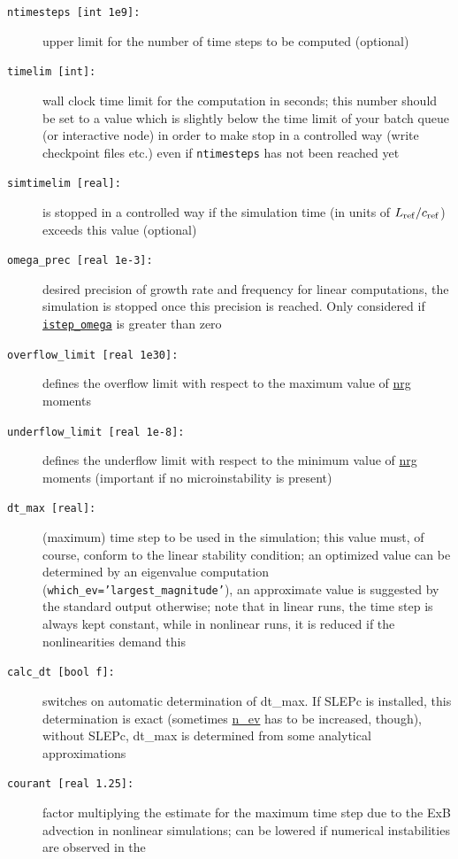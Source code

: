 \documentclass[12pt]{article}
\begin{document}
\begin{description}
\item[\texttt{ntimesteps [int 1e9]:}] upper limit for the number of time steps to be computed (optional)
\item[\texttt{timelim [int]:}] wall clock time limit for the \gene computation in seconds; this number
  should be set to a value which is slightly below the time limit of your batch queue (or interactive
  node) in order to make \gene stop in a  controlled way (write checkpoint files etc.) even if
  \texttt{ntimesteps} has not been reached yet
\item[\texttt{simtimelim [real]:}] \gene is stopped in a controlled way if the simulation time (in units of
 $L_{\rm ref}/c_{\rm ref}$) exceeds this value (optional)
\item[\hypertarget{omega_prec}{\tt omega\_prec [real 1e-3]:}] 
  desired precision of growth rate and frequency for linear computations, the simulation is stopped once
  this precision is reached. Only considered if \hyperlink{istep_omega}{\tt istep\_omega} is greater than zero
\item[{\tt overflow\_limit [real 1e30]:}] defines the overflow limit with respect to the maximum 
  value of \hyperref[subsec:nrg-file]{nrg} moments
\item[{\tt underflow\_limit [real 1e-8]:}] defines the underflow limit with respect to the minimum 
  value of \hyperref[subsec:nrg-file]{nrg} moments (important if no microinstability is present)
\item[\texttt{dt\_max [real]:}] (maximum) time step to be used in the simulation; this value must,
  of course, conform to the linear stability condition; an optimized value can be determined by an
  eigenvalue computation \\(\texttt{which\_ev='largest\_magnitude'}), an approximate value is suggested by the \gene
  standard output otherwise; note that in linear runs, the time step is always kept constant, 
  while in nonlinear runs, it is reduced if the nonlinearities demand this
\item[\texttt{calc\_dt [bool f]:}] switches on automatic determination of dt\_max. If SLEPc is installed, 
  this determination is exact (sometimes \hyperlink{n_ev}{n\_ev} has to be increased,
  though), without SLEPc, dt\_max is determined from some analytical approximations
\item[\texttt{courant [real 1.25]:}] factor multiplying the estimate for the maximum time step due to 
  the ExB advection in nonlinear simulations; can be lowered if numerical instabilities are observed in the

\end{description}
\end{document}
